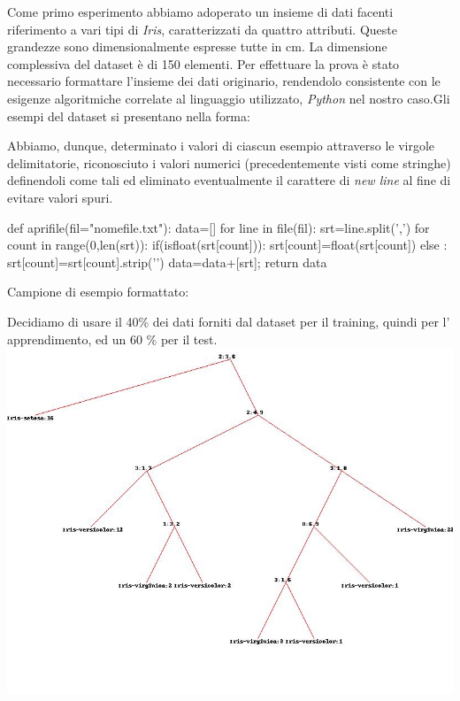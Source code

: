 		Come primo esperimento abbiamo adoperato un insieme di dati facenti riferimento a vari tipi di \emph{Iris}, caratterizzati da quattro attributi.
		Queste grandezze sono dimensionalmente espresse tutte in cm. La dimensione complessiva del dataset è di 150 elementi. Per effettuare la prova è stato necessario formattare l'insieme dei dati originario, rendendolo consistente con le esigenze algoritmiche correlate al linguaggio utilizzato, \emph{Python} nel nostro caso.\newline Gli esempi del dataset si presentano nella forma:
		
		Abbiamo, dunque, determinato i valori di ciascun esempio attraverso le virgole delimitatorie, riconosciuto i valori numerici (precedentemente visti come stringhe) definendoli come tali ed eliminato eventualmente il carattere di \textit{new line} al fine di evitare valori spuri.
		\newline
		\begin{python}
		def aprifile(fil="nomefile.txt"):
			data=[]
			for line in file(fil):
				srt=line.split(',')
				for count in range(0,len(srt)):
					if(isfloat(srt[count])):
						srt[count]=float(srt[count])
					else :
						srt[count]=srt[count].strip('\n')
				data=data+[srt];
			return data
		\end{python}
		Campione di esempio formattato:
		
		
		Decidiamo di usare il 40\% dei dati forniti dal dataset per il training, quindi per l' apprendimento, ed un 60 \% per il test.
		\includegraphics[scale=0.37]{iris.jpg}
		
